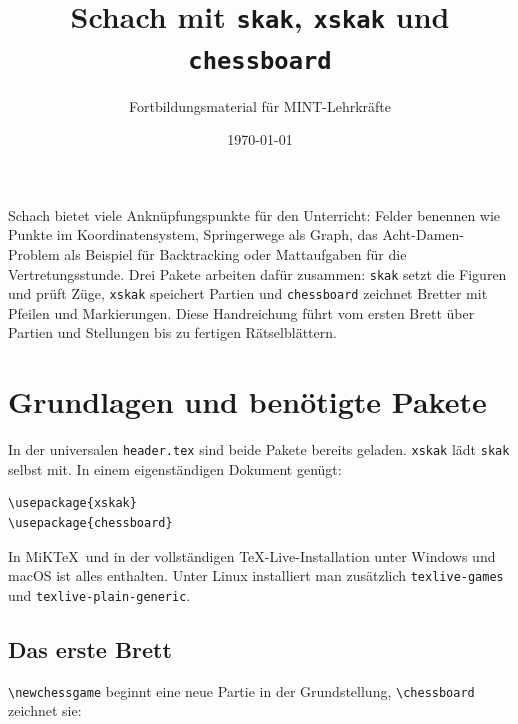 



\title{Schach mit \texttt{skak}, \texttt{xskak} und \texttt{chessboard}}
\author{Fortbildungsmaterial für MINT-Lehrkräfte}
\date{\today}
\pagestyle{plain}
\setlength{\parskip}{1.5em} %
\setlength{\emergencystretch}{2em} %




\maketitle

Schach bietet viele Anknüpfungspunkte für den Unterricht: Felder benennen wie Punkte im Koordinatensystem, Springerwege als Graph, das Acht-Damen-Problem als Beispiel für Backtracking oder Mattaufgaben für die Vertretungsstunde. Drei Pakete arbeiten dafür zusammen: \texttt{skak} setzt die Figuren und prüft Züge, \texttt{xskak} speichert Partien und \texttt{chessboard} zeichnet Bretter mit Pfeilen und Markierungen. Diese Handreichung führt vom ersten Brett über Partien und Stellungen bis zu fertigen Rätselblättern.



\section{Grundlagen und benötigte Pakete}

In der universalen \texttt{header.tex} sind beide Pakete bereits geladen. \texttt{xskak} lädt \texttt{skak} selbst mit. In einem eigenständigen Dokument genügt:

\begin{lstlisting}[style=latex]
\usepackage{xskak}
\usepackage{chessboard}
\end{lstlisting}

In MiK\TeX\ und in der vollständigen TeX-Live-Installation unter Windows und macOS ist alles enthalten. Unter Linux installiert man zusätzlich \texttt{texlive-games} und \texttt{texlive-plain-generic}.


\subsection{Das erste Brett}

\texttt{\textbackslash newchessgame} beginnt eine neue Partie in der Grundstellung, \texttt{\textbackslash chessboard} zeichnet sie:


